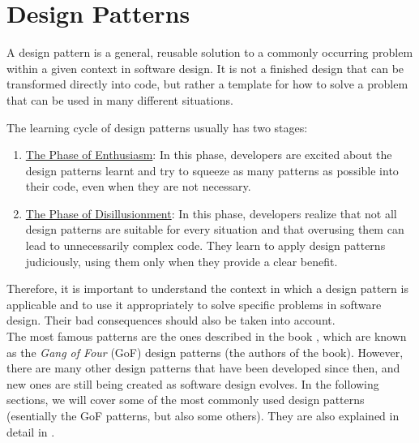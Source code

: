 \chapter{Design Patterns}

A design pattern is a general, reusable solution to a commonly occurring problem within a given context in software design. It is not a finished design that can be transformed directly into code, but rather a template for how to solve a problem that can be used in many different situations.

The learning cycle of design patterns usually has two stages:
\begin{enumerate}
    \item \ul{The Phase of Enthusiasm}: In this phase, developers are excited about the design patterns learnt and try to squeeze as many patterns as possible into their code, even when they are not necessary.
    \item \ul{The Phase of Disillusionment}: In this phase, developers realize that not all design patterns are suitable for every situation and that overusing them can lead to unnecessarily complex code. They learn to apply design patterns judiciously, using them only when they provide a clear benefit.
\end{enumerate}

Therefore, it is important to understand the context in which a design pattern is applicable and to use it appropriately to solve specific problems in software design. Their bad consequences should also be taken into account.\\

The most famous patterns are the ones described in the book , which are known as the \emph{Gang of Four} (GoF) design patterns (the authors of the book). However, there are many other design patterns that have been developed since then, and new ones are still being created as software design evolves. In the following sections, we will cover some of the most commonly used design patterns (esentially the GoF patterns, but also some others). They are also explained in detail in .

